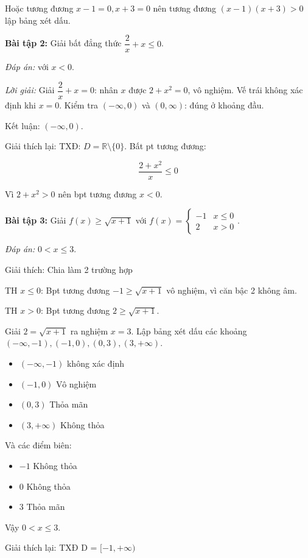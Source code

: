 \documentclass[12pt,a4paper]{article}
\begin{document}
Hoặc tương đương $x - 1 = 0, x + 3 = 0$ nên tương đương $(x - 1)(x + 3) > 0$ lập bảng xét dấu.

\textbf{Bài tập 2:} Giải bất đẳng thức $\dfrac{2}{x} + x \le 0$.

\textit{Đáp án:} với $x < 0$.

\textit{Lời giải:} Giải $\dfrac{2}{x} + x = 0$: nhân $x$ được $2 + x^2 = 0$, vô nghiệm. Vế trái không xác định khi $x = 0$. Kiểm tra $(-\infty,0)$ và $(0,\infty)$: đúng ở khoảng đầu.

Kết luận: $(-\infty,0)$.

Giải thích lại: TXĐ: $D = \mathbb{R} \setminus \{0\}$. Bất pt tương đương:

\[
\dfrac{2 + x^2}{x} \le 0
\]

Vì $2 + x^2 > 0$ nên bpt tương đương $x < 0$.

\textbf{Bài tập 3:} Giải $f(x) \ge \sqrt{x+1}$ với $f(x) = \begin{cases} -1 & x \le 0 \\ 2 & x > 0 \end{cases}$.

\textit{Đáp án:} $0 < x \le 3$.

Giải thích: Chia làm 2 trường hợp

TH $x \le 0$: Bpt tương đương $-1 \ge \sqrt{x + 1}$ vô nghiệm, vì căn bậc 2 không âm.

TH $x > 0$: Bpt tương đương $2 \ge \sqrt{x + 1}$.

Giải $2 = \sqrt{x + 1}$ ra nghiệm $x = 3$. Lập bảng xét dấu các khoảng $(-\infty, -1), (-1, 0), (0, 3), (3, +\infty)$.

\begin{itemize}
    \item $(-\infty, -1)$ không xác định
    \item $(-1, 0)$ Vô nghiệm
    \item $(0, 3)$ Thỏa mãn
    \item $(3, +\infty)$ Không thỏa
\end{itemize}

Và các điểm biên:

\begin{itemize}
    \item $-1$ Không thỏa
    \item $0$ Không thỏa
    \item $3$ Thỏa mãn
\end{itemize}

Vậy $0 < x \le 3$.

Giải thích lại: TXĐ D = $[-1, +\infty)$
\end{document}
